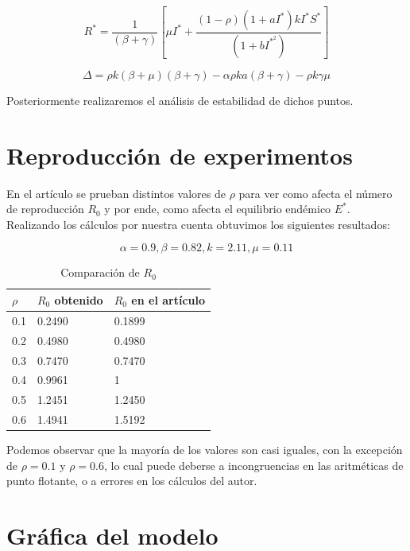 \documentclass{article}
\begin{document}
\begin{equation}
    R^* = \dfrac{1}{(\beta + \gamma)}\left[\mu I^* + \dfrac{(1-\rho)(1+aI^*)kI^*S^*}{(1+bI^{{*}^2})} \right]
\end{equation}

\begin{equation}
    \Delta = \rho k (\beta + \mu)(\beta + \gamma) - \alpha \rho ka(\beta + \gamma) - \rho k \gamma \mu
\end{equation}

Posteriormente realizaremos el an\'alisis de estabilidad de dichos puntos.

\section{Reproducci\'on de experimentos}

En el art\'iculo se prueban distintos valores de $\rho$ para ver como afecta el n\'umero de reproducci\'on $R_0$ y por ende, como afecta el equilibrio end\'emico $E^*$. Realizando los c\'alculos por nuestra cuenta obtuvimos los siguientes resultados:

$$\alpha=0.9, \beta=0.82, k=2.11, \mu=0.11$$

\begin{table}[H]
    \centering
    \begin{tabular}{|l|l|l|}
    \hline
    $\rho$ & $R_0$ obtenido & $R_0$ en el art\'iculo \\ \hline
    0.1 & 0.2490 & 0.1899 \\ \hline
    0.2 & 0.4980 & 0.4980 \\ \hline
    0.3 & 0.7470 & 0.7470 \\ \hline
    0.4 & 0.9961 & 1 \\ \hline
    0.5 & 1.2451 & 1.2450 \\ \hline
    0.6 & 1.4941 & 1.5192 \\ \hline
    \end{tabular}
    \caption{Comparación de $R_0$}
    \label{tab:r_0_comparison}
\end{table}

Podemos observar que la mayor\'ia de los valores son casi iguales, con la excepci\'on de $\rho=0.1$ y $\rho=0.6$, lo cual puede deberse a incongruencias en las aritm\'eticas de punto flotante, o a errores en los c\'alculos del autor.

\section{Gr\'afica del modelo}
\end{document}
